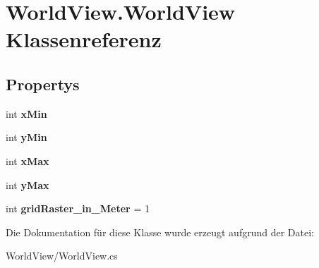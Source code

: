 \hypertarget{class_world_view_1_1_world_view}{
\section{WorldView.WorldView Klassenreferenz}
\label{class_world_view_1_1_world_view}
}
\subsection*{Propertys}
\begin{DoxyCompactItemize}
\item 
\hypertarget{class_world_view_1_1_world_view_ad1de8864244eb9f5cc1d1db64baf3da7}{
int {\bfseries xMin}}
\label{class_world_view_1_1_world_view_ad1de8864244eb9f5cc1d1db64baf3da7}

\item 
\hypertarget{class_world_view_1_1_world_view_afdd97059cc2b145c9df471356e2e3ace}{
int {\bfseries yMin}}
\label{class_world_view_1_1_world_view_afdd97059cc2b145c9df471356e2e3ace}

\item 
\hypertarget{class_world_view_1_1_world_view_aab2a8d7785a7c57ab04d63e2ca0fb590}{
int {\bfseries xMax}}
\label{class_world_view_1_1_world_view_aab2a8d7785a7c57ab04d63e2ca0fb590}

\item 
\hypertarget{class_world_view_1_1_world_view_a2c3888888de54bd2822d281d9f98f33f}{
int {\bfseries yMax}}
\label{class_world_view_1_1_world_view_a2c3888888de54bd2822d281d9f98f33f}

\item 
\hypertarget{class_world_view_1_1_world_view_ac74e2532daa0bbe9f9e6a28cafd5d080}{
int {\bfseries gridRaster\_\-in\_\-Meter} = 1}
\label{class_world_view_1_1_world_view_ac74e2532daa0bbe9f9e6a28cafd5d080}

\end{DoxyCompactItemize}


Die Dokumentation für diese Klasse wurde erzeugt aufgrund der Datei:\begin{DoxyCompactItemize}
\item 
WorldView/WorldView.cs\end{DoxyCompactItemize}
